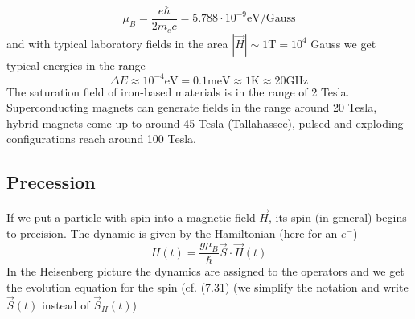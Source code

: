 \begin{equation}
    \mu_{B}=\frac{e \hbar}{2 m_{e} c}=5.788 \cdot 10^{-9} \mathrm{eV} / \mathrm{Gauss}
    \end{equation}
and with typical laboratory fields in the area $|\vec{H}| \sim 1 \mathrm{T}=10^{4}$ Gauss we get typical energies in the range
\begin{equation}
    \Delta E \approx 10^{-4} \mathrm{eV}=0.1 \mathrm{meV} \approx 1 \mathrm{K} \approx 20 \mathrm{GHz}
    \end{equation}
The saturation field of iron-based materials is in the range of 2 Tesla. Superconducting magnets can generate fields in the range around 20 Tesla, hybrid magnets come up to around 45 Tesla (Tallahassee), pulsed and exploding configurations reach around 100 Tesla.
\subsection{Precession}
If we put a particle with spin into a magnetic field $\vec{H}$, its spin (in general) begins to precision. The dynamic is given by the Hamiltonian (here for an $e^−$)
\begin{equation}
    H(t)=\frac{g \mu_{B}}{\hbar} \vec{S} \cdot \vec{H}(t)
    \end{equation}
In the Heisenberg picture the dynamics are assigned to the operators and we get the evolution equation for the spin (cf. (7.31) (we simplify the notation and write $\vec{S}(t)$ instead of $\vec{S}_H(t)$)

